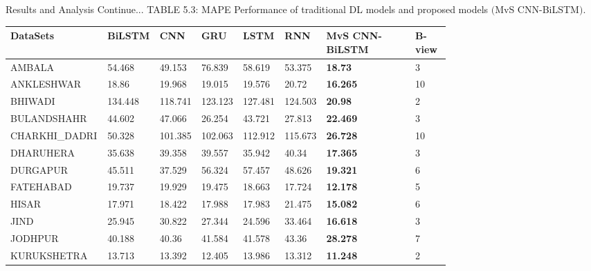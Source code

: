 \documentclass[12pt, aspectratio=169]{beamer}
\begin{document}
\begin{frame}{Results and Analysis  \tiny{Continue...}}
	\centering
	\scriptsize {TABLE 5.3: MAPE Performance of traditional DL models and proposed models $($MvS CNN-BiLSTM$)$.}\\
	\begin{table}
		\begin{tabular}[c]{|p{0.165\linewidth}|p{0.096\linewidth}|p{0.044\linewidth}|p{0.044\linewidth}|p{0.06\linewidth}|p{0.044\linewidth}|p{0.206\linewidth}|p{0.08\linewidth}|} \hline
		\footnotesize \textbf{DataSets} &\footnotesize  \textbf{ BiLSTM } &\footnotesize  \textbf{CNN} &\footnotesize  \textbf{GRU} &\footnotesize  \textbf{LSTM } &\footnotesize  \textbf{RNN} & \footnotesize  \textbf{MvS CNN-BiLSTM } & \footnotesize  \textbf{B-view} \\ \hline
		AMBALA         & 54.468       & 49.153    & 76.839    & 58.619     & 53.375    & \textbf{18.73}  & 3      \\ \hline
		ANKLESHWAR     & 18.86        & 19.968    & 19.015    & 19.576     & 20.72     & \textbf{16.265} & 10     \\ \hline
		BHIWADI        & 134.448      & 118.741   & 123.123   & 127.481    & 124.503   & \textbf{20.98}  & 2      \\ \hline
		BULANDSHAHR    & 44.602       & 47.066    & 26.254    & 43.721     & 27.813    & \textbf{22.469} & 3      \\ \hline
		CHARKHI\_DADRI & 50.328       & 101.385   & 102.063   & 112.912    & 115.673   & \textbf{26.728} & 10     \\ \hline
		DHARUHERA      & 35.638       & 39.358    & 39.557    & 35.942     & 40.34     & \textbf{17.365} & 3      \\ \hline
		DURGAPUR       & 45.511       & 37.529    & 56.324    & 57.457     & 48.626    & \textbf{19.321} & 6      \\ \hline
		FATEHABAD      & 19.737       & 19.929    & 19.475    & 18.663     & 17.724    & \textbf{12.178} & 5      \\ \hline
		HISAR          & 17.971       & 18.422    & 17.988    & 17.983     & 21.475    & \textbf{15.082} & 6      \\ \hline
		JIND           & 25.945       & 30.822    & 27.344    & 24.596     & 33.464    & \textbf{16.618} & 3      \\ \hline
		JODHPUR        & 40.188       & 40.36     & 41.584    & 41.578     & 43.36     & \textbf{28.278} & 7      \\ \hline
		KURUKSHETRA    & 13.713       & 13.392    & 12.405    & 13.986     & 13.312    & \textbf{11.248} & 2      \\ \hline

\end{tabular}
\end{table}
\end{frame}
\end{document}
